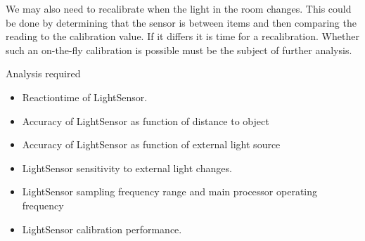 We may also need to recalibrate when the light in the room changes. This could be done by determining that the sensor is between items and then comparing the reading to the calibration value. If it differs it is time for a recalibration. Whether such an on-the-fly calibration is possible must be the subject of further analysis.

\noindent Analysis required
\begin{itemize}
    \item Reactiontime of LightSensor.
    \item Accuracy of LightSensor as function of distance to object
    \item Accuracy of LightSensor as function of external light source
    \item LightSensor sensitivity to external light changes.
    \item LightSensor sampling frequency range and main processor operating frequency
    \item LightSensor calibration performance.
\end{itemize}
